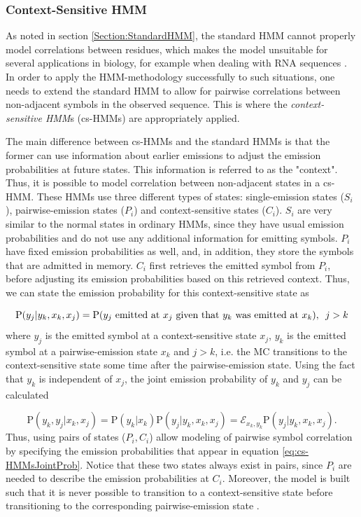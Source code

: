 \documentclass{article}\usepackage[]{graphicx}\usepackage[]{color}
\begin{document}
\subsubsection{Context-Sensitive HMM}\label{Section:cs-HMMs}
As noted in section \ref{Section:StandardHMM}, the standard HMM cannot properly model correlations between residues, which makes the model unsuitable for several applications in biology, for example when dealing with RNA sequences \cite{Yoon2009}. In order to apply the HMM-methodology successfully to such situations, one needs to extend the standard HMM to allow for pairwise correlations between non-adjacent symbols in the observed sequence. This is where the \textit{context-sensitive HMM}s (cs-HMMs) are appropriately applied.

The main difference between cs-HMMs and the standard HMMs is that the former can use information about earlier emissions to adjust the emission probabilities at future states. This information is referred to as the "context". Thus, it is possible to model correlation between non-adjacent states in a cs-HMM. These HMMs use three different types of states: single-emission states ($S_i$),  pairwise-emission states ($P_i$) and context-sensitive states ($C_i$). $S_i$ are very similar to the normal states in ordinary HMMs, since they have usual emission probabilities and do not use any additional information for emitting symbols. $P_i$ have fixed emission probabilities as well, and, in addition, they store the symbols that are admitted in memory. $C_i$ first retrieves the emitted symbol from $P_i$, before adjusting its emission probabilities based on this retrieved context. Thus, we can state the emission probability for this context-sensitive state as 

\begin{equation*}
    \text{P}(y_j|y_k, x_k, x_j) = \text{P}(y_j\text{ emitted at }x_j\text{ given that }y_k\text{ was emitted at }x_k), \hspace{0.5em} j>k
\end{equation*}
where $y_j$ is the emitted symbol at a context-sensitive state $x_j$, $y_k$ is the emitted symbol at a pairwise-emission state $x_k$ and $j>k$, i.e. the MC transitions to the context-sensitive state some time after the pairwise-emission state. Using the fact that $y_k$ is independent of $x_j$, the joint emission probability of $y_k$ and $y_j$ can be calculated

\begin{equation}
    \text{P}(y_k, y_j|x_k, x_j) = \text{P}(y_k|x_k)\text{P}(y_j|y_k, x_k, x_j) = \mathcal{E}_{x_k, y_k}\text{P}(y_j|y_k, x_k, x_j).
    \label{eq:cs-HMMsJointProb}
\end{equation}
Thus, using pairs of states ($P_i, C_i$) allow modeling of pairwise symbol correlation by specifying the emission probabilities that appear in equation \eqref{eq:cs-HMMsJointProb}. Notice that these two states always exist in pairs, since $P_i$ are needed to describe the emission probabilities at $C_i$. Moreover, the model is built such that it is never possible to transition to a context-sensitive state before transitioning to the corresponding pairwise-emission state \cite{Yoon2009}. 
\end{document}
